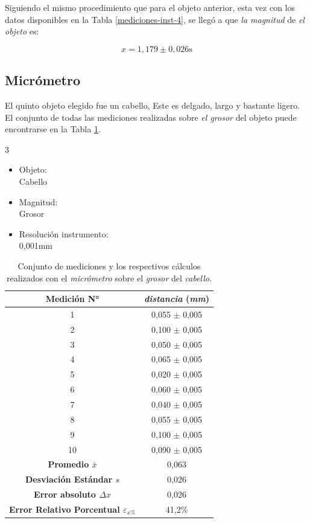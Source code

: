 \documentclass[12pt,a4paper]{article}
\begin{document}
Siguiendo el mismo procedimiento que para el objeto anterior, esta vez con los datos disponibles en la Tabla \ref{mediciones-inst-4}, se llegó a que \textit{la magnitud} de \textit{el objeto} es:

\begin{equation*}
x = 1,179 \pm 0,026 \textrm{s}
\end{equation*}

\subsection{Micrómetro}

El quinto objeto elegido fue un cabello, Este es delgado, largo y bastante ligero. El conjunto de todas las mediciones realizadas sobre \textit{el grosor} del objeto puede encontrarse en la Tabla \ref{mediciones-inst-5}.

\begin{multicols}{3}
\begin{itemize}
    \item Objeto: \\ Cabello
    \item Magnitud: \\ Grosor 
    \item Resolución instrumento: \\ 0,001mm
\end{itemize}
\end{multicols}

\begin{table}[h!]
\centering
\begin{tabular}{|c|c|}
\hline
\textbf{Medición N°} & \textit{distancia} \textbf{(}\textit{mm}\textbf{)} \\ \hline
1 & 0,055 $\pm$ 0,005\\ \hline
2 & 0,100 $\pm$ 0,005\\ \hline 
3 & 0,050 $\pm$ 0,005\\ \hline 
4 & 0,065 $\pm$ 0,005\\ \hline 
5 & 0,020 $\pm$ 0,005\\ \hline 
6 & 0,060 $\pm$ 0,005\\ \hline 
7 & 0,040 $\pm$ 0,005\\ \hline 
8 & 0,055 $\pm$ 0,005\\ \hline 
9 & 0,100 $\pm$ 0,005\\ \hline 
10 & 0,090 $\pm$ 0,005\\ \hline 
\textbf{Promedio $\bar{x}$} & 0,063 \\ \hline 
\textbf{Desviación Estándar $s$} & 0,026 \\ \hline
\textbf{Error absoluto $\Delta x$} & 0,026 \\ \hline
\textbf{Error Relativo Porcentual $\varepsilon_{x\%}$} & 41,2\% \\ \hline
\end{tabular}
\caption{Conjunto de mediciones y los respectivos cálculos realizados con el \textit{micrómetro} sobre el \textit{grosor} del \textit{cabello}.}
\label{mediciones-inst-5}
\end{table}
\end{document}
